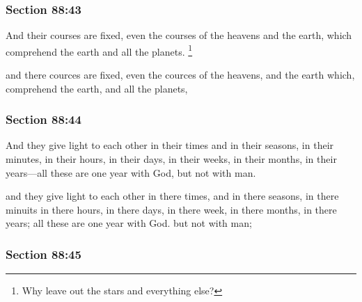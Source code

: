 	\subsubsection{Section 88:43} %
		\label{DC88-43}

		And their courses are fixed, even the courses of the heavens and the earth, which comprehend the earth and all the planets.%
			\footnote{%
				Why leave out the stars and everything else?
				}

		\begin{framed}
		\scriptsize
			\begin{compactdesc}
				\item[JSP] and there cources are fixed, even the cources of the heavens, and the earth which, comprehend the earth, and all the planets,
			\end{compactdesc}
		\end{framed}

	\subsubsection{Section 88:44} %
		\label{DC88-44}

		And they give light to each other in their times and in their seasons, in their minutes, in their hours, in their days, in their weeks, in their months, in their years---all these are one year with God, but not with man.

		\begin{framed}
		\scriptsize
			\begin{compactdesc}
				\item[JSP] and they give light to each other in there times, and in there seasons, in there minuits in there hours, in there days, in there week, in there months, in there years; all these are one year with God. but not with man;
			\end{compactdesc}
		\end{framed}

	\subsubsection{Section 88:45} %
		\label{DC88-45}

